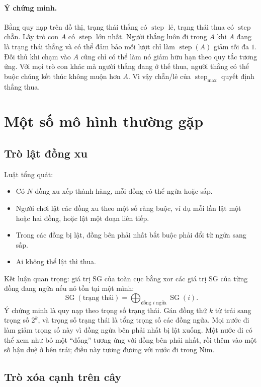 \documentclass[11pt]{article}
\newcommand{\SG}{\operatorname{SG}}
\newcommand{\bigxor}{\bigoplus}
\newcommand{\step}{\operatorname{step}}
\begin{document}
\paragraph{Ý chứng minh.}
Bằng quy nạp trên đồ thị, trạng thái thắng có \(\step\) lẻ, trạng thái thua
có \(\step\) chẵn. Lấy trò con \(A\) có \(\step\) lớn nhất. Người thắng luôn
đi trong \(A\) khi \(A\) đang là trạng thái thắng và có thể đảm bảo mỗi lượt
chỉ làm \(\step(A)\) giảm tối đa \(1\). Đối thủ khi chạm vào \(A\) cũng chỉ
có thể làm nó giảm hữu hạn theo quy tắc tương ứng. Với mọi trò con khác mà
người thắng đang ở thế thua, người thắng có thể buộc chúng kết thúc không
muộn hơn \(A\). Vì vậy chẵn/lẻ của \(\step_{\max}\) quyết định thắng thua.

\section{Một số mô hình thường gặp}

\subsection{Trò lật đồng xu}

Luật tổng quát:
\begin{itemize}
  \item Có \(N\) đồng xu xếp thành hàng, mỗi đồng có thể ngửa hoặc sấp.
  \item Người chơi lật các đồng xu theo một số ràng buộc, ví dụ mỗi lần lật
  một hoặc hai đồng, hoặc lật một đoạn liên tiếp.
  \item Trong các đồng bị lật, đồng bên phải nhất bắt buộc phải đổi từ ngửa
  sang sấp.
  \item Ai không thể lật thì thua.
\end{itemize}

Kết luận quan trọng: giá trị SG của toàn cục bằng xor các giá trị SG của từng
đồng đang ngửa nếu nó tồn tại một mình:
\[
  \SG(\text{trạng thái})=\bigxor_{\text{đồng }i\text{ ngửa}}\SG(i).
\]
Ý chứng minh là quy nạp theo trọng số trạng thái. Gán đồng thứ \(k\) từ trái
sang trọng số \(2^k\), và trọng số trạng thái là tổng trọng số các đồng ngửa.
Mọi nước đi làm giảm trọng số này vì đồng ngửa bên phải nhất bị lật xuống.
Một nước đi có thể xem như bỏ một ``đống'' tương ứng với đồng bên phải nhất,
rồi thêm vào một số hậu duệ ở bên trái; điều này tương đương với nước đi trong
Nim.

\subsection{Trò xóa cạnh trên cây}
\end{document}
